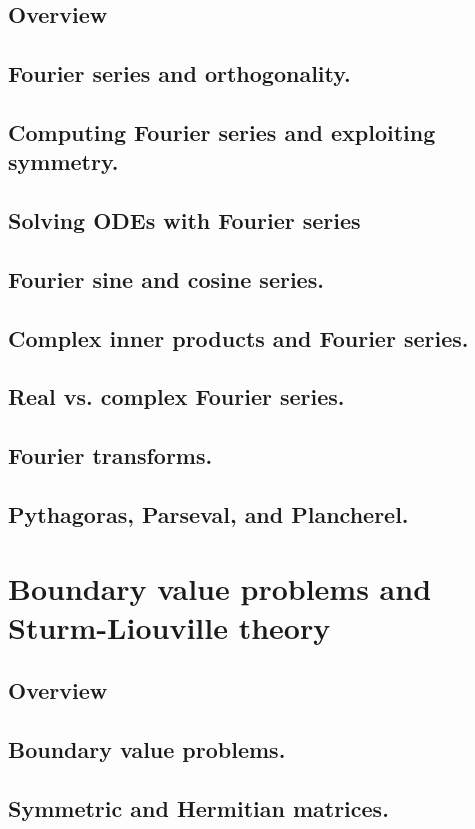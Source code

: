 \documentclass{article}
\begin{document}
\subsection*{Overview}
\subsection{Fourier series and orthogonality.}
\subsection{Computing Fourier series and exploiting symmetry.}
\subsection{Solving ODEs with Fourier series}
\subsection{Fourier sine and cosine series.}
\subsection{Complex inner products and Fourier series.}
\subsection{Real vs. complex Fourier series.}
\subsection{Fourier transforms.}
\subsection{Pythagoras, Parseval, and Plancherel.}
\pagebreak
\section{Boundary value problems and Sturm-Liouville theory}
\subsection*{Overview}
\subsection{Boundary value problems.}
\subsection{Symmetric and Hermitian matrices.}
\end{document}

